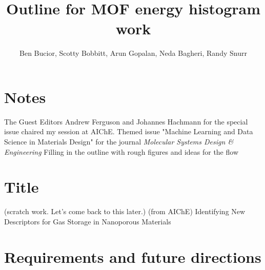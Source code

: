 \documentclass[letterpaper]{article}
\title{Outline for MOF energy histogram work}
\author{Ben Bucior, Scotty Bobbitt, Arun Gopalan, Neda Bagheri, Randy Snurr}
\begin{document}
\maketitle

%

\section{Notes}
\begin{outline}
	\1 The Guest Editors Andrew Ferguson and Johannes Hachmann for the special issue chaired my session at AIChE.
	\1 Themed issue "Machine Learning and Data Science in Materials Design" for the journal \textit{Molecular Systems Design \& Engineering}
	\1 Filling in the outline with rough figures and ideas for the flow
\end{outline}


\section{Title}
\begin{outline}
	\1 (scratch work.  Let's come back to this later.)
	\1 (from AIChE) Identifying New Descriptors for Gas Storage in Nanoporous Materials
\end{outline}

\section{Requirements and future directions}
\end{document}
